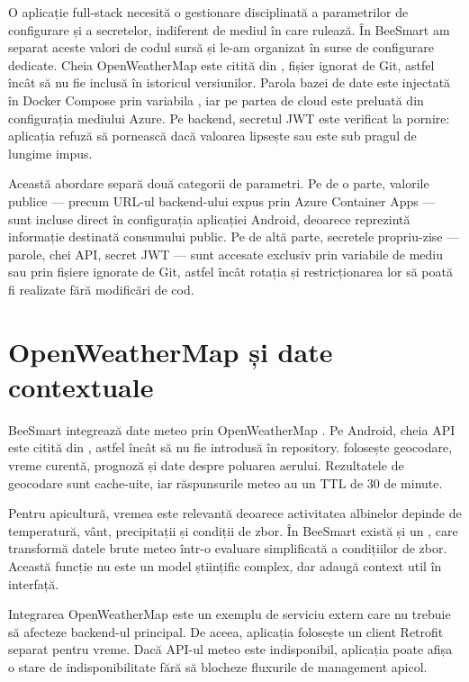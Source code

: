 O aplicație full-stack necesită o gestionare disciplinată a parametrilor de configurare și a secretelor, indiferent de mediul în care rulează. În BeeSmart am separat aceste valori de codul sursă și le-am organizat în surse de configurare dedicate. Cheia OpenWeatherMap este citită din , fișier ignorat de Git, astfel încât să nu fie inclusă în istoricul versiunilor. Parola bazei de date este injectată în Docker Compose prin variabila , iar pe partea de cloud este preluată din configurația mediului Azure. Pe backend, secretul JWT este verificat la pornire: aplicația refuză să pornească dacă valoarea lipsește sau este sub pragul de lungime impus.

Această abordare separă două categorii de parametri. Pe de o parte, valorile publice — precum URL-ul backend-ului expus prin Azure Container Apps — sunt incluse direct în configurația aplicației Android, deoarece reprezintă informație destinată consumului public. Pe de altă parte, secretele propriu-zise — parole, chei API, secret JWT — sunt accesate exclusiv prin variabile de mediu sau prin fișiere ignorate de Git, astfel încât rotația și restricționarea lor să poată fi realizate fără modificări de cod.

\section{OpenWeatherMap și date contextuale}

BeeSmart integrează date meteo prin OpenWeatherMap \cite{openWeatherDocs}. Pe Android, cheia API este citită din , astfel încât să nu fie introdusă în repository.  folosește geocodare, vreme curentă, prognoză și date despre poluarea aerului. Rezultatele de geocodare sunt cache-uite, iar răspunsurile meteo au un TTL de 30 de minute.

Pentru apicultură, vremea este relevantă deoarece activitatea albinelor depinde de temperatură, vânt, precipitații și condiții de zbor. În BeeSmart există și un , care transformă datele brute meteo într-o evaluare simplificată a condițiilor de zbor. Această funcție nu este un model științific complex, dar adaugă context util în interfață.

Integrarea OpenWeatherMap este un exemplu de serviciu extern care nu trebuie să afecteze backend-ul principal. De aceea, aplicația folosește un client Retrofit separat pentru vreme. Dacă API-ul meteo este indisponibil, aplicația poate afișa o stare de indisponibilitate fără să blocheze fluxurile de management apicol.


